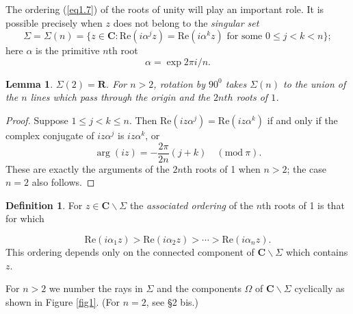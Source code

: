 \documentclass{surv-l}
\theoremstyle{plain}
\newtheorem{lem}[theorem]{Lemma}
\theoremstyle{definition}
\newtheorem*{defi}{Definition}
\numberwithin{equation}{chapter}
\begin{document}
The ordering (\ref{eq1.7}) of the roots of unity will play an important role. It is possible precisely when $z$ does not belong to the \emph{singular set}
\begin{equation}\label{eq2.4}
\Sigma=\Sigma(n)=\{z\in \mathbf{C}:\mathrm{Re}(i\alpha^{j}z)=\mathrm{Re}(i\alpha^{k}z) \text{ for some } 0\leq j<k<n\};
\end{equation}
here $\alpha$ is the primitive $n$th root
\begin{equation}\label{eq2.5}
\alpha=\exp 2\pi i/n.
\end{equation}
\setcounter{theorem}{5}
\begin{lem}\label{chap01:lem2.6} $\Sigma(2)=\mathbf{R}$. For $n>2$, rotation by $90^{0}$ takes $\Sigma(n)$ to the union of the $n$ lines which pass through the origin and the $2nth$ roots of $1$.
\end{lem}
\begin{proof}
Suppose $1\leq j<k\leq n$. Then $\mathrm{Re}(iz\alpha^{j})=\mathrm{Re}(iz\alpha^{k})$ if and only if the complex conjugate of $iz\alpha^{j}$ is $iz\alpha^{k}$, or
\begin{equation*}
\arg(iz)=-\frac{2\pi}{2n}(j+k)\quad (\mathrm{mod}\ \pi).
\end{equation*}
These are exactly the arguments of the $2n$th roots of 1 when $n>2$; the case $n =2$ also follows.
\end{proof}

\begin{defi}
For $ z\in \mathbf{C}\backslash \Sigma$ the \emph{associated ordering} of the $n$th roots of 1 is that for which
\end{defi}
\setcounter{equation}{6}
\begin{equation}\label{eq2.7}
\mathrm{Re}(i\alpha_{1}z)>\mathrm{Re}(i\alpha_{2}z)>\cdots >\mathrm{Re}(i\alpha_{n}z).
\end{equation}
This ordering depends only on the connected component of $ \mathbf{C}\backslash \Sigma$ which contains $z$.

For $n>2$ we number the rays in $\Sigma$ and the components $\Omega$ of $ \mathbf{C}\backslash \Sigma$ cyclically as shown in Figure \ref{fig1}. (For $n=2$, see \S2 bis.)
\end{document}
